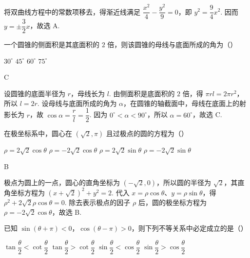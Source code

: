 \begin{solution}
将双曲线方程中的常数项移去，得渐近线满足 \(\dfrac{x^2}{4}-\dfrac{y^2}{9}=0\)，即 \(y^2=\dfrac{9}{4}x^2\). 因而 \(y=\pm\dfrac{3}{2}x\)，故选 A.
\end{solution}

\begin{problem}
一个圆锥的侧面积是其底面积的 \(2\text{ 倍}\)，则该圆锥的母线与底面所成的角为（\quad）

\choices
    {\(30^{\circ}\)}
    {\(45^{\circ}\)}
    {\(60^{\circ}\)}
    {\(75^{\circ}\)}
\end{problem}

\begin{answer}
C
\end{answer}

\begin{solution}
设圆锥的底面半径为 \(r\)，母线长为 \(l\). 由侧面积是底面积的 \(2\) 倍，得 \(\pi rl=2\pi r^2\)，所以 \(l=2r\). 设母线与底面所成的角为 \(\alpha\)，在圆锥的轴截面中，母线在底面上的射影长为 \(r\)，故 \(\cos\alpha=\dfrac{r}{l}=\dfrac12\). 因为 \(0^{\circ}<\alpha<90^{\circ}\)，所以 \(\alpha=60^{\circ}\)，故选 C.
\end{solution}

\begin{problem}
在极坐标系中，圆心在 \((\sqrt{2},\pi)\) 且过极点的圆的方程为（\quad）

\choices
    {\(\rho=2\sqrt{2}\cos\theta\)}
    {\(\rho=-2\sqrt{2}\cos\theta\)}
    {\(\rho=2\sqrt{2}\sin\theta\)}
    {\(\rho=-2\sqrt{2}\sin\theta\)}
\end{problem}

\begin{answer}
B
\end{answer}

\begin{solution}
极点为圆上的一点，圆心的直角坐标为 \((-\sqrt{2},0)\)，所以圆的半径为 \(\sqrt{2}\)，其直角坐标方程为 \((x+\sqrt{2})^2+y^2=2\). 代入 \(x=\rho\cos\theta\)、\(y=\rho\sin\theta\)，得 \(\rho^2+2\sqrt{2}\rho\cos\theta=0\). 除去表示极点的因子 \(\rho\) 后，圆的极坐标方程为 \(\rho=-2\sqrt{2}\cos\theta\)，故选 B.
\end{solution}

\begin{problem}
已知 \(\sin(\theta+\pi)<0\)，\(\cos(\theta-\pi)>0\)，则下列不等关系中必定成立的是（\quad）

\choices
    {\(\tan\dfrac{\theta}{2}<\cot\dfrac{\theta}{2}\)}
    {\(\tan\dfrac{\theta}{2}>\cot\dfrac{\theta}{2}\)}
    {\(\sin\dfrac{\theta}{2}<\cos\dfrac{\theta}{2}\)}
    {\(\sin\dfrac{\theta}{2}>\cos\dfrac{\theta}{2}\)}
\end{problem}

